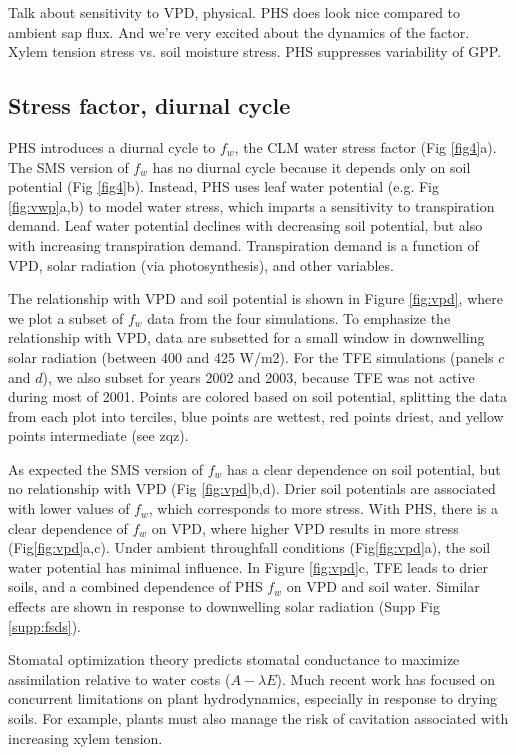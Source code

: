 \documentclass[draft,linenumbers]{agujournal}
\begin{document}
Talk about sensitivity to VPD, physical.
PHS does look nice compared to ambient sap flux.
And we're very excited about the dynamics of the factor.
Xylem tension stress vs. soil moisture stress.
PHS suppresses variability of GPP.


\subsection{Stress factor, diurnal cycle}

PHS introduces a diurnal cycle to $f_w$, the CLM water stress factor (Fig \ref{fig4}a). 
The SMS version of $f_w$ has no diurnal cycle because it depends only on soil potential (Fig \ref{fig4}b).
Instead, PHS uses leaf water potential (e.g. Fig \ref{fig:vwp}a,b) to model water stress, which imparts a sensitivity to transpiration demand.
Leaf water potential declines with decreasing soil potential, but also with increasing transpiration demand.
Transpiration demand is a function of VPD, solar radiation (via photosynthesis), and other variables.

The relationship with VPD and soil potential is shown in Figure \ref{fig:vpd}, where we plot a subset of $f_w$ data from the four simulations. 
To emphasize the relationship with VPD, data are subsetted for a small window in downwelling solar radiation (between 400 and 425 W/m2).
For the TFE simulations (panels $c$ and $d$), we also subset for years 2002 and 2003, because TFE was not active during most of 2001.
Points are colored based on soil potential, splitting the data from each plot into terciles, blue points are wettest, red points driest, and yellow points intermediate (see zqz).

As expected the SMS version of $f_w$ has a clear dependence on soil potential, but no relationship with VPD (Fig \ref{fig:vpd}b,d). 
Drier soil potentials are associated with lower values of $f_w$, which corresponds to more stress.
With PHS, there is a clear dependence of $f_w$ on VPD, where higher VPD results in more stress (Fig\ref{fig:vpd}a,c).
Under ambient throughfall conditions (Fig\ref{fig:vpd}a), the soil water potential has minimal influence.
In Figure \ref{fig:vpd}c, TFE leads to drier soils, and a combined dependence of PHS $f_w$ on VPD and soil water.
Similar effects are shown in response to downwelling solar radiation (Supp Fig \ref{supp:fsds}).


Stomatal optimization theory predicts stomatal conductance to maximize assimilation relative to water costs ($A-\lambda E$).
Much recent work has focused on concurrent limitations on plant hydrodynamics, especially in response to drying soils.
For example, plants must also manage the risk of cavitation associated with increasing xylem tension.
\end{document}
